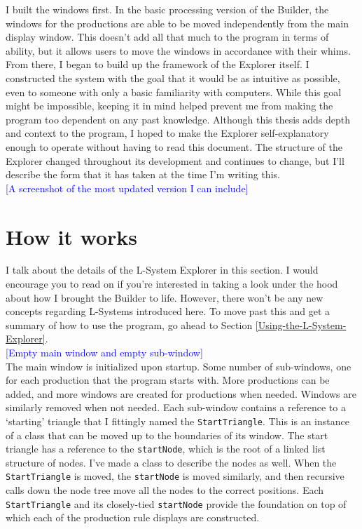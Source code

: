 \documentclass[12pt,twoside]{reedthesis}
\newcommand{\code}[1]{\texttt{#1}}
\begin{document}
	I built the windows first. In the basic processing version of the Builder, the windows for the productions are able to be moved independently from the main display window. This doesn't add all that much to the program in terms of ability, but it allows users to move the windows in accordance with their whims. From there, I began to build up the framework of the Explorer itself. I constructed the system with the goal that it would be as intuitive as possible, even to someone with only a basic familiarity with computers. While this goal might be impossible, keeping it in mind helped prevent me from making the program too dependent on any past knowledge. Although this thesis adds depth and context to the program, I hoped to make the Explorer self-explanatory enough to operate without having to read this document. The structure of the Explorer changed throughout its development and continues to change, but I'll describe the form that it has taken at the time I'm writing this.\\
	
	\textcolor{blue}{[A screenshot of the most updated version I can include]}\\
	
\section{How it works}

	I talk about the details of the L-System Explorer in this section. I would encourage you to read on if you're interested in taking a look under the hood about how I brought the Builder to life. However, there won't be any new concepts regarding L-Systems introduced here. To move past this and get a summary of how to use the program, go ahead to Section \ref{Using-the-L-System-Explorer}.\\
	
	\textcolor{blue}{[Empty main window and empty sub-window]}\\
	
	The main window is initialized upon startup. Some number of sub-windows, one for each production that the program starts with. More productions can be added, and more windows are created for productions when needed. Windows are similarly removed when not needed. Each sub-window contains a reference to a `starting' triangle that I fittingly named the \code{StartTriangle}. This is an instance of a class that can be moved up to the boundaries of its window. The start triangle has a reference to the \code{startNode}, which is the root of a linked list structure of nodes. I've made a class to describe the nodes as well. When the \code{StartTriangle} is moved, the \code{startNode} is moved similarly, and then recursive calls down the node tree move all the nodes to the correct positions. Each \code{StartTriangle} and its closely-tied \code{startNode} provide the foundation on top of which each of the production rule displays are constructed.\\
	
\end{document}
